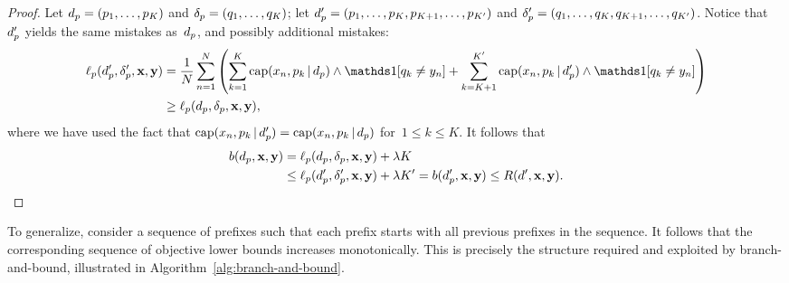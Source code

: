 \begin{arxiv}
\begin{proof}
Let ${d_p = (p_1, \dots, p_K)}$ and ${\delta_p = (q_1, \dots, q_K)}$;
let ${d_p' = (p_1, \dots, p_K, p_{K+1}, \dots, p_{K'})}$
and ${\delta_p' = (q_1, \dots, q_K, q_{K+1}, \dots, q_{K'})}$.
%
Notice that~$d_p'$ yields the same mistakes as~$d_p$,
and possibly additional mistakes:
\begin{align}
\Loss_p(\Prefix', \Labels', \x, \y)
&= \frac{1}{N} \sum_{n=1}^N \left( \sum_{k=1}^K \Cap(x_n, p_k \given \Prefix) \wedge \one [ q_k \neq y_n ]
+ \sum_{k=K+1}^{K'} \Cap(x_n, p_k \given \Prefix') \wedge \one [ q_k \neq y_n ] \right) \nn \\
&\ge \Loss_p(\Prefix, \Labels, \x, \y),
\label{eq:prefix-loss}
\end{align}
where we have used the fact that
${\textnormal{cap}(x_n, p_k \,|\, d_p') = \textnormal{cap}(x_n, p_k \,|\, d_p)}$
for~${1 \le k \le K}$.
%
It follows that
\begin{align}
b(d_p, \mathbf{x}, \mathbf{y}) &= \ell_p(d_p, \delta_p, \mathbf{x}, \mathbf{y}) + {\lambda} K \nonumber \\
&\le  \ell_p(d_p', \delta_p', \mathbf{x}, \mathbf{y}) + {\lambda} K' = b(d_p', \mathbf{x}, \mathbf{y})
\le R({d}', \mathbf{x}, \mathbf{y}).
\label{eq:prefix-lb}
\end{align}
\end{proof}
\end{arxiv}

To generalize, consider a sequence of prefixes such that each prefix
starts with all previous prefixes in the sequence.
%
It follows that the corresponding sequence of objective lower bounds
increases monotonically.
%
This is precisely the structure required and exploited by branch-and-bound,
illustrated in Algorithm~\ref{alg:branch-and-bound}.

